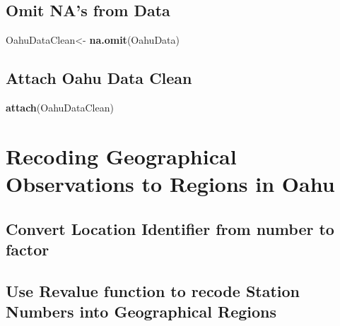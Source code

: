 \documentclass[12pt,]{article}
\newenvironment{Shaded}{\begin{snugshade}}{\end{snugshade}}
\newcommand{\KeywordTok}[1]{\textcolor[rgb]{0.13,0.29,0.53}{\textbf{#1}}}
\newcommand{\StringTok}[1]{\textcolor[rgb]{0.31,0.60,0.02}{#1}}
\newcommand{\OperatorTok}[1]{\textcolor[rgb]{0.81,0.36,0.00}{\textbf{#1}}}
\newcommand{\NormalTok}[1]{#1}
\begin{document}
\subsection{Omit NA's from Data}\label{omit-nas-from-data}

\begin{Shaded}
\begin{Highlighting}[]
\NormalTok{OahuDataClean<-}\StringTok{ }\KeywordTok{na.omit}\NormalTok{(OahuData) }
\end{Highlighting}
\end{Shaded}

\subsection{Attach Oahu Data Clean}\label{attach-oahu-data-clean}

\begin{Shaded}
\begin{Highlighting}[]
\KeywordTok{attach}\NormalTok{(OahuDataClean)}
\end{Highlighting}
\end{Shaded}

\section{Recoding Geographical Observations to Regions in
Oahu}\label{recoding-geographical-observations-to-regions-in-oahu}

\subsection{Convert Location Identifier from number to
factor}\label{convert-location-identifier-from-number-to-factor}

\begin{Shaded}
\end{Shaded}

\subsection{Use Revalue function to recode Station Numbers into
Geographical
Regions}\label{use-revalue-function-to-recode-station-numbers-into-geographical-regions}
\end{document}
